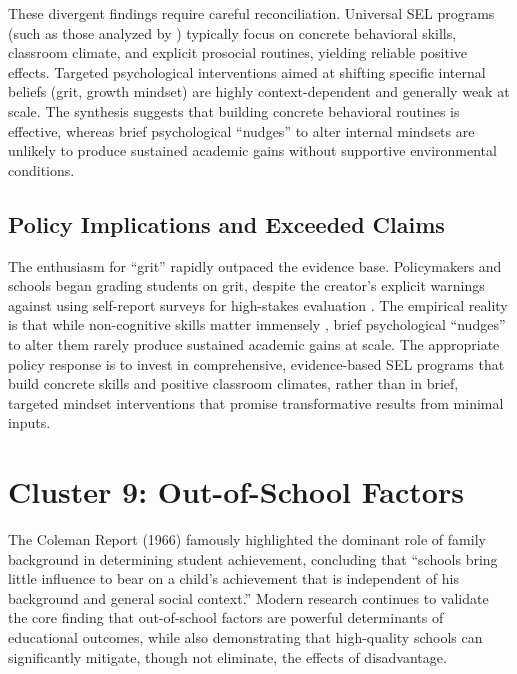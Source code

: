 \documentclass[12pt,letterpaper]{article}
\begin{document}
These divergent findings require careful reconciliation. Universal SEL programs (such as those analyzed by \citet{durlak2011}) typically focus on concrete behavioral skills, classroom climate, and explicit prosocial routines, yielding reliable positive effects. Targeted psychological interventions aimed at shifting specific internal beliefs (grit, growth mindset) are highly context-dependent and generally weak at scale. The synthesis suggests that building concrete behavioral routines is effective, whereas brief psychological ``nudges'' to alter internal mindsets are unlikely to produce sustained academic gains without supportive environmental conditions.

\subsection{Policy Implications and Exceeded Claims}

The enthusiasm for ``grit'' \citep{duckworth2007} rapidly outpaced the evidence base. Policymakers and schools began grading students on grit, despite the creator's explicit warnings against using self-report surveys for high-stakes evaluation \citep{duckworth2016nyt}. The empirical reality is that while non-cognitive skills matter immensely \citep{heckman2006}, brief psychological ``nudges'' to alter them rarely produce sustained academic gains at scale. The appropriate policy response is to invest in comprehensive, evidence-based SEL programs that build concrete skills and positive classroom climates, rather than in brief, targeted mindset interventions that promise transformative results from minimal inputs.

\section{Cluster 9: Out-of-School Factors}

The Coleman Report (1966) famously highlighted the dominant role of family background in determining student achievement, concluding that ``schools bring little influence to bear on a child's achievement that is independent of his background and general social context.'' Modern research continues to validate the core finding that out-of-school factors are powerful determinants of educational outcomes, while also demonstrating that high-quality schools can significantly mitigate, though not eliminate, the effects of disadvantage.
\end{document}
